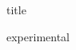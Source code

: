 \documentclass[12pt,a4paper]{article}
\begin{document}
{title}

{experimental}

\clearpage



\end{document}
